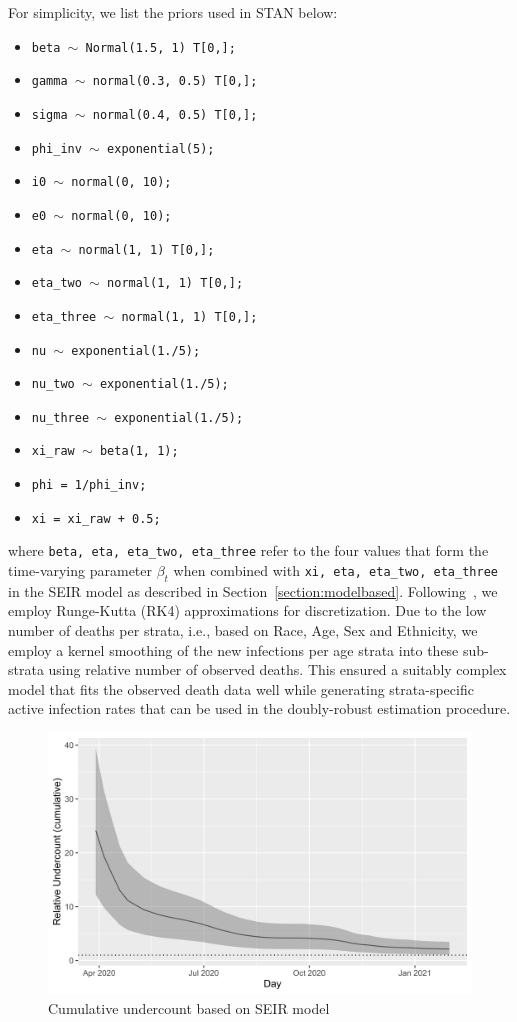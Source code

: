 \documentclass[12pt]{amsart}
\numberwithin{equation}{section}
\theoremstyle{plain}
\def\code#1{\texttt{#1}}
\begin{document}
For simplicity, we list the priors used in STAN below:
\begin{itemize}
  \item \code{beta $\sim$ Normal(1.5, 1) T[0,];}
  \item \code{gamma $\sim$ normal(0.3, 0.5) T[0,];}
  \item \code{sigma $\sim$ normal(0.4, 0.5) T[0,];}
  \item \code{phi\_inv $\sim$ exponential(5);}
  \item \code{i0 $\sim$ normal(0, 10);}
  \item \code{e0 $\sim$ normal(0, 10);}
  \item \code{eta $\sim$ normal(1, 1) T[0,];}
  \item \code{eta\_two $\sim$ normal(1, 1) T[0,];}
  \item \code{eta\_three $\sim$ normal(1, 1) T[0,];}
  \item \code{nu $\sim$ exponential(1./5);}
  \item \code{nu\_two $\sim$ exponential(1./5);}
  \item \code{nu\_three $\sim$ exponential(1./5);}
  \item \code{xi\_raw $\sim$ beta(1, 1);}
  \item \code{phi = 1/phi\_inv;}
  \item \code{xi = xi\_raw + 0.5;}
\end{itemize}
where \code{beta, eta, eta\_two, eta\_three} refer to the four values that form the time-varying parameter $\beta_t$ when combined with \code{xi, eta, eta\_two, eta\_three} in the SEIR model as described in Section~\ref{section:modelbased}. Following~\cite{Song2020}, we employ Runge-Kutta (RK4) approximations for discretization.  Due to the low number of deaths per strata, i.e., based on Race, Age, Sex and Ethnicity, we employ a kernel smoothing of the new infections per age strata into these sub-strata using relative number of observed deaths.  This ensured a suitably complex model that fits the observed death data well while generating strata-specific active infection rates that can be used in the doubly-robust estimation procedure.

\begin{figure}[!th]
 \centering
 \includegraphics[width=.6\linewidth]{../figs/cumulative_undercounting.png}
 \caption{Cumulative undercount based on SEIR model}
 \label{fig:undercounting}
\end{figure}
\end{document}

